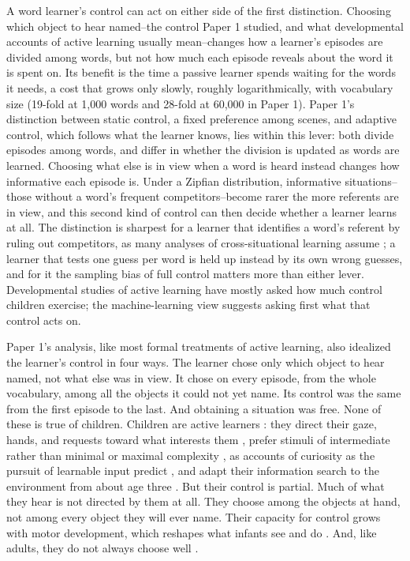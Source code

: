 \documentclass[a4paper,natbib,man]{apa6}
\begin{document}
A word learner's control can act on either side of the first distinction. Choosing which object to hear named--the control Paper 1 studied, and what developmental accounts of active learning usually mean--changes how a learner's episodes are divided among words, but not how much each episode reveals about the word it is spent on. Its benefit is the time a passive learner spends waiting for the words it needs, a cost that grows only slowly, roughly logarithmically, with vocabulary size (19-fold at 1,000 words and 28-fold at 60,000 in Paper 1). Paper 1's distinction between static control, a fixed preference among scenes, and adaptive control, which follows what the learner knows, lies within this lever: both divide episodes among words, and differ in whether the division is updated as words are learned. Choosing what else is in view when a word is heard instead changes how informative each episode is. Under a Zipfian distribution, informative situations--those without a word's frequent competitors--become rarer the more referents are in view, and this second kind of control can then decide whether a learner learns at all. The distinction is sharpest for a learner that identifies a word's referent by ruling out competitors, as many analyses of cross-situational learning assume \citep{Blythe:2010,Vogt:2012}; a learner that tests one guess per word is held up instead by its own wrong guesses, and for it the sampling bias of full control matters more than either lever. Developmental studies of active learning have mostly asked how much control children exercise; the machine-learning view suggests asking first what that control acts on.

Paper 1's analysis, like most formal treatments of active learning, also idealized the learner's control in four ways. The learner chose only which object to hear named, not what else was in view. It chose on every episode, from the whole vocabulary, among all the objects it could not yet name. Its control was the same from the first episode to the last. And obtaining a situation was free. None of these is true of children. Children are active learners \citep{Foushee:2023,Gureckis:2012}: they direct their gaze, hands, and requests toward what interests them \citep{Yu:2009active,Partridge:2015}, prefer stimuli of intermediate rather than minimal or maximal complexity \citep{Kidd:2012}, as accounts of curiosity as the pursuit of learnable input predict \citep{Oudeyer:2016,gottlieb2018towards}, and adapt their information search to the environment from about age three \citep{Ruggeri:2022}. But their control is partial. Much of what they hear is not directed by them at all. They choose among the objects at hand, not among every object they will ever name. Their capacity for control grows with motor development, which reshapes what infants see and do \citep{Kretch:2014,Iverson:2010,Walle:2014}. And, like adults, they do not always choose well \citep{Tauber:2013,Bazhydai:2026}.
\end{document}
